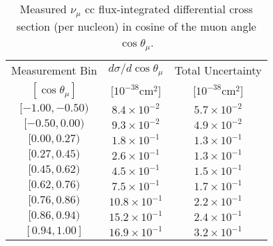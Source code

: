 \begin{table}[]
\caption[$\nu_\mu$ \acrshort{cc} Differential Cross Section in Muon Angle]{Measured $\nu_\mu$ \acrshort{cc} flux-integrated differential cross section (per nucleon) in cosine of the muon angle $\cos\theta_\mu$.}
\label{tab:xsec_muangle}
\centering
\begin{tabular}{ccc}
\toprule
Measurement Bin     & ${d\sigma}/{d\cos\theta_\mu}$ & Total Uncertainty\\
$[\cos\theta_\mu]$  & [$10^{-38} \text{cm}^2$]      & [$10^{-38} \text{cm}^2$]\\
\midrule
$[-1.00, -0.50)$ & $8.4 \times 10^{-2}$ & $5.7 \times 10^{-2}$\\
$[-0.50, 0.00)$ & $9.3 \times 10^{-2}$ & $4.9 \times 10^{-2}$\\
$[0.00, 0.27)$ & $1.8 \times 10^{-1}$ & $1.3 \times 10^{-1}$\\
$[0.27, 0.45)$ & $2.6 \times 10^{-1}$ & $1.3 \times 10^{-1}$\\
$[0.45, 0.62)$ & $4.5 \times 10^{-1}$ & $1.5 \times 10^{-1}$\\
$[0.62, 0.76)$ & $7.5 \times 10^{-1}$ & $1.7 \times 10^{-1}$\\
$[0.76, 0.86)$ & $10.8 \times 10^{-1}$ & $2.2 \times 10^{-1}$\\
$[0.86, 0.94)$ & $15.2 \times 10^{-1}$ & $2.4 \times 10^{-1}$\\
$[0.94, 1.00]$ & $16.9 \times 10^{-1}$ & $3.2 \times 10^{-1}$\\
\bottomrule
\end{tabular}
\end{table}




